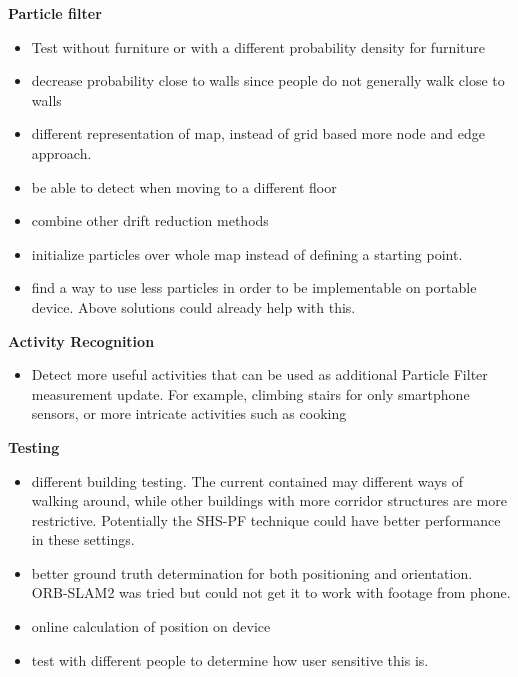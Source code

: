 {\textbf{Particle filter}
\begin{itemize}
	\item Test without furniture or with a different probability density for furniture
	\item decrease probability close to walls since people do not generally walk close to walls
	\item different representation of map, instead of grid based more node and edge approach. 
	\item be able to detect when moving to a different floor
	\item combine other drift reduction methods
	\item initialize particles over whole map instead of defining a starting point.
	\item find a way to use less particles in order to be implementable on portable device. Above solutions could already help with this.
\end{itemize}

\textbf{Activity Recognition}
\begin{itemize}
	\item Detect more useful activities that can be used as additional Particle Filter measurement update. For example, climbing stairs for only smartphone sensors, or more intricate activities such as cooking
\end{itemize}

\textbf{Testing}
\begin{itemize}
	\item different building testing. The current contained may different ways of walking around, while other buildings with more corridor structures are more restrictive. Potentially the SHS-PF technique could have better performance in these settings.
	\item better ground truth determination for both positioning and orientation. ORB-SLAM2 was tried but could not get it to work with footage from phone.
	\item online calculation of position on device
	\item test with different people to determine how user sensitive this is.
\end{itemize}}
